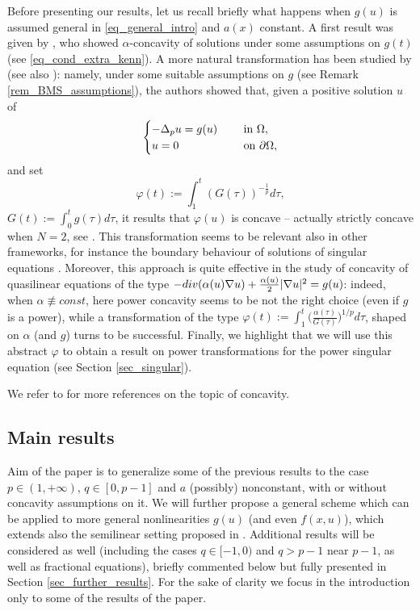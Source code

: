 \documentclass[11pt, reqno]{amsart}
\theoremstyle{definition}
\numberwithin{equation}{section}
\newcommand{\dive}{{\rm div}}
\newcommand{\nequiv}{\not \equiv}
\begin{document}
Before presenting our results, let us recall briefly what happens when $g(u)$ is assumed general in \eqref{eq_general_intro} and $a(x)$ constant. 
A first result was given by \cite[Theorem 3.3]{Ken85}, who showed $\alpha$-concavity of solutions under some assumptions on $g(t)$ (see \eqref{eq_cond_extra_kenn}). 
A more natural transformation has been studied by \cite{BMS22} (see also \cite{CaFr85, Kaw85W, Ken88}): namely, under some suitable assumptions on $g$ (see Remark \ref{rem_BMS_assumptions}), the authors showed that, given a positive solution $u$ of
\begin{equation}\label{eq_intr_general_p_g}
 \begin{cases}
-\Delta_p u = g(u) & \quad \hbox{ in $\Omega$},\\ 
u =0 & \quad \hbox{ on $\partial \Omega$},
\end{cases}
\end{equation}
and set
$$\varphi(t):= \int_1^t (G(\tau))^{-\frac{1}{p}} d \tau,$$
$G(t) :=\int_0^t g(\tau) d\tau$, it results that $\varphi(u)$ is concave -- actually strictly concave when $N=2$, see \cite{BMS23}. 
This transformation seems to be relevant also in other frameworks, for instance the boundary behaviour of solutions of singular equations \cite[Section 2.6]{Gla02}.
Moreover, this approach is quite effective in the study of concavity of quasilinear equations of the type $-\dive(\alpha(u) \nabla u) + \frac{\alpha(u)}{2} |\nabla u|^2 = g(u)$: indeed, when $\alpha \nequiv const$, here power concavity seems to be not the right choice (even if $g$ is a power), while a transformation of the type $\varphi(t):= \int_1^t \big(\frac{\alpha(\tau)}{G(\tau)}\big)^{1/p} d \tau$, shaped on $\alpha$ (and $g$) turns to be successful. 
Finally, we highlight that we will use this abstract $\varphi$ to obtain a result on power transformations for the power singular equation (see Section \ref{sec_singular}).

We refer to \cite{AAGS23,GMrS25} for more references on the topic of concavity. 


\subsection{Main results}

Aim of the paper is to generalize some of the previous results to the case $p \in (1,+\infty)$, $q \in [0,p-1]$ and $a$ (possibly) nonconstant, with or without concavity assumptions on it. 
We will further propose a general scheme which can be applied to more general nonlinearities $g(u)$ (and even $f(x,u)$), which extends also the semilinear setting proposed in \cite{BMS22}. 
Additional results will be considered as well (including the cases $q \in [-1, 0)$ and $q>p-1$ near $p-1$, as well as fractional equations), briefly commented below but fully presented in Section \ref{sec_further_results}. 
For the sake of clarity we focus in the introduction only to some of the results of the paper.
 
\end{document}
